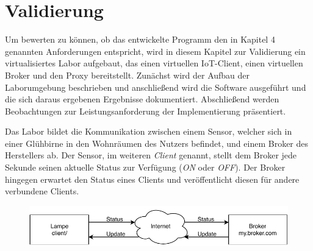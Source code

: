 \chapter{Validierung}
    
Um bewerten zu können, ob das entwickelte Programm den in Kapitel 4 genannten Anforderungen entspricht, wird in diesem Kapitel zur Validierung ein virtualisiertes Labor aufgebaut, das einen virtuellen \ac{IoT}-Client, einen virtuellen Broker und den Proxy bereitstellt.
Zunächst wird der Aufbau der Laborumgebung beschrieben und anschließend wird die Software ausgeführt und die sich daraus ergebenen Ergebnisse dokumentiert. Abschließend werden Beobachtungen zur Leistungsanforderung der Implementierung präsentiert.

Das Labor bildet die Kommunikation zwischen einem Sensor, welcher sich in einer Glühbirne in den Wohnräumen des Nutzers befindet, und einem Broker des Herstellers ab. Der Sensor, im weiteren \emph{Client} genannt, stellt dem Broker jede Sekunde seinen aktuelle Status zur Verfügung (\emph{ON} oder \emph{OFF}). Der Broker hingegen erwartet den Status eines Clients und veröffentlicht diesen für andere verbundene Clients.

\begin{figure}[h]%
    \centering
    \includegraphics[width=14cm]{tex/bilder/6_validierung/Szenario.pdf}
    \label{fig:darstellung-szenario}
\end{figure}

